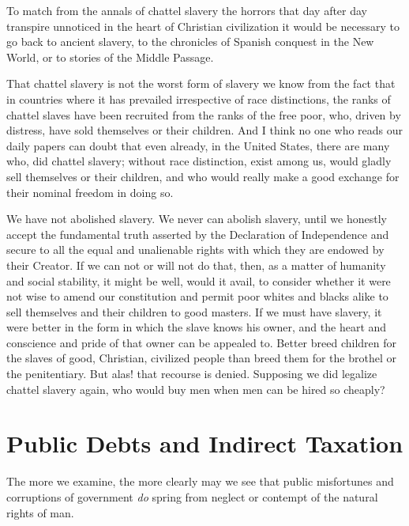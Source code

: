 \documentclass{book}
\begin{document}
To match from the annals of chattel slavery the horrors that day after day transpire unnoticed in the heart of Christian civilization it would be necessary to go back to ancient slavery, to the chronicles of Spanish conquest in the New World, or to stories of the Middle Passage.

That chattel slavery is not the worst form of slavery we know from the fact that in countries where it has prevailed irrespective of race distinctions, the ranks of chattel slaves have been recruited from the ranks of the free poor, who, driven by distress, have sold themselves or their children. And I think no one who reads our daily papers can doubt that even already, in the United States, there are many who, did chattel slavery; without race distinction, exist among us, would gladly sell themselves or their children, and who would really make a good exchange for their nominal freedom in doing so.

We have not abolished slavery. We never can abolish slavery, until we honestly accept the fundamental truth asserted by the Declaration of Independence and secure to all the equal and unalienable rights with which they are endowed by their Creator. If we can not or will not do that, then, as a matter of humanity and social stability, it might be well, would it avail, to consider whether it were not wise to amend our constitution and permit poor whites and blacks alike to sell themselves and their children to good masters. If we must have slavery, it were better in the form in which the slave knows his owner, and the heart and conscience and pride of that owner can be appealed to. Better breed children for the slaves of good, Christian, civilized people than breed them for the brothel or the penitentiary. But alas! that recourse is denied. Supposing we did legalize chattel slavery again, who would buy men when men can be hired so cheaply?

\chapter{Public Debts and Indirect Taxation}
\label{chapter-16}
The more we examine, the more clearly may we see that public misfortunes and corruptions of government \emph{do} spring from neglect or contempt of the natural rights of man.
\end{document}
